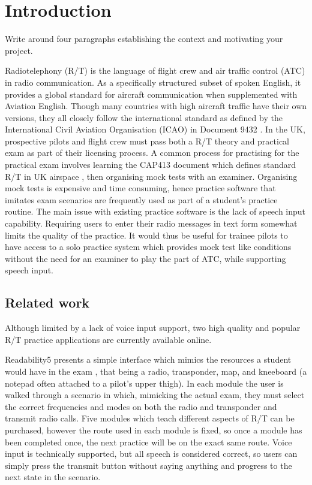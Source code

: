 \chapter{Introduction}
\label{ch:introduction}

Write around four paragraphs establishing the context and motivating your project.

Radiotelephony (R/T) is the language of flight crew and air traffic control (ATC) in radio communication. As a specifically structured subset of spoken English, it provides a global standard for aircraft communication when supplemented with Aviation English. Though many countries with high aircraft traffic have their own versions, they all closely follow the international standard as defined by the International Civil Aviation Organisation (ICAO) in Document 9432 \cite{Doc9432}. In the UK, prospective pilots and flight crew must pass both a R/T theory and practical exam as part of their licensing process. A common process for practising for the practical exam involves learning the CAP413 document which defines standard R/T in UK airspace \cite{CAP413}, then organising mock tests with an examiner. Organising mock tests is expensive and time consuming, hence practice software that imitates exam scenarios are frequently used as part of a student's practice routine. The main issue with existing practice software is the lack of speech input capability. Requiring users to enter their radio messages in text form somewhat limits the quality of the practice. It would thus be useful for trainee pilots to have access to a solo practice system which provides mock test like conditions without the need for an examiner to play the part of ATC, while supporting speech input.

\section{Related work}

Although limited by a lack of voice input support, two high quality and popular R/T practice applications are currently available online.

Readability5 presents a simple interface which mimics the resources a student would have in the exam \cite{Readability5}, that being a radio, transponder, map, and kneeboard (a notepad often attached to a pilot's upper thigh). In each module the user is walked through a scenario in which, mimicking the actual exam, they must select the correct frequencies and modes on both the radio and transponder and transmit radio calls. Five modules which teach different aspects of R/T can be purchased, however the route used in each module is fixed, so once a module has been completed once, the next practice will be on the exact same route. Voice input is technically supported, but all speech is considered correct, so users can simply press the transmit button without saying anything and progress to the next state in the scenario.

